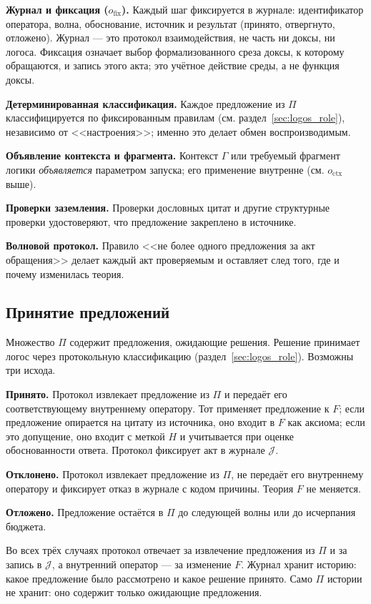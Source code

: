 \documentclass[12pt,a4paper]{article}
\begin{document}
\textbf{Журнал и фиксация ($o_{\text{fix}}$).} Каждый шаг фиксируется в
журнале: идентификатор оператора, волна, обоснование, источник и результат
(принято, отвергнуто, отложено). Журнал --- это протокол взаимодействия,
не часть ни доксы, ни логоса. Фиксация означает выбор формализованного
среза доксы, к которому обращаются, и запись этого акта; это учётное
действие среды, а не функция доксы.

\textbf{Детерминированная классификация.} Каждое предложение из $\Pi$
классифицируется по фиксированным правилам (см. раздел~\ref{sec:logos_role}),
независимо от <<настроения>>; именно это делает обмен воспроизводимым.

\textbf{Объявление контекста и фрагмента.} Контекст $\Gamma$ или
требуемый фрагмент логики \emph{объявляется} параметром запуска; его
применение внутренне (см. $o_{\text{ctx}}$ выше).

\textbf{Проверки заземления.} Проверки дословных цитат и другие
структурные проверки удостоверяют, что предложение закреплено в источнике.

\textbf{Волновой протокол.} Правило <<не более одного предложения за акт
обращения>> делает каждый акт проверяемым и оставляет след того, где и
почему изменилась теория.

\subsection{Принятие предложений}
\label{sec:acceptance}

Множество $\Pi$ содержит предложения, ожидающие решения. Решение принимает
логос через протокольную классификацию (раздел~\ref{sec:logos_role}).
Возможны три исхода.

\textbf{Принято.} Протокол извлекает предложение из $\Pi$ и передаёт его
соответствующему внутреннему оператору. Тот применяет предложение к $F$;
если предложение опирается на цитату из источника, оно входит в $F$ как
аксиома; если это допущение, оно входит с меткой $H$ и учитывается при
оценке обоснованности ответа. Протокол фиксирует акт в журнале
$\mathcal{J}$.

\textbf{Отклонено.} Протокол извлекает предложение из $\Pi$, не передаёт
его внутреннему оператору и фиксирует отказ в журнале с кодом причины.
Теория $F$ не меняется.

\textbf{Отложено.} Предложение остаётся в $\Pi$ до следующей волны или
до исчерпания бюджета.

Во всех трёх случаях протокол отвечает за извлечение предложения из
$\Pi$ и за запись в $\mathcal{J}$, а внутренний оператор --- за изменение
$F$. Журнал хранит историю: какое предложение было рассмотрено и какое
решение принято. Само $\Pi$ истории не хранит: оно содержит только
ожидающие предложения.
\end{document}
